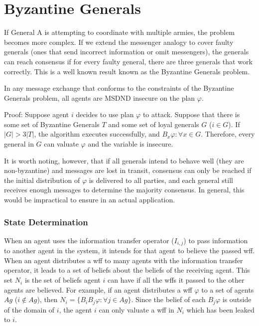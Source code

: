 \section{Byzantine Generals}

If General A is attempting to coordinate with multiple armies, the problem becomes more complex. If we extend the messenger analogy to cover faulty generals (ones that send incorrect information or omit messengers), the generals can reach consensus if for every faulty general, there are three generals that work correctly. This is a well known result known as the Byzantine Generals problem.

\begin{thm}
In any message exchange that conforms to the constraints of the Byzantine Generals problem, all agents are MSDND insecure on the plan $\varphi$.
\end{thm}

Proof: Suppose agent $i$ decides to use plan $\varphi$ to attack. Suppose that there is some set of Byzantine Generals $T$ and some set of loyal generals $G$ ($i \in G$). If $|G| > 3|T|$, the algorithm executes successfully, and $B_x \varphi : \forall x \in G $. Therefore, every general in $G$ can valuate $\varphi$ and the variable is insecure.

It is worth noting, however, that if all generals intend to behave well (they are non-byzantine) and messages are lost in transit, consensus can only be reached if the initial distribution of $\varphi$ is delivered to all parties, and each general still receives enough messages to determine the majority consensus. In general, this would be impractical to ensure in an actual application.

\subsubsection{State Determination}

When an agent uses the information transfer operator ($I_{i,j}$) to pass information to another agent in the system, it intends for that agent to believe the passed wff. When an agent distributes a wff to many agents with the information transfer operator, it leads to a set of beliefs about the beliefs of the receiving agent. This set $N_i$ is the set of beliefs agent $i$ can have if all the wffs it passed to the other agents are believed. For example, if an agent distributes a wff $\varphi$ to a set of agents $Ag$ ($i \not \in Ag$), then $N_i = \{ B_i B_j \varphi : \forall j \in Ag \}$. Since the belief of each $B_j \varphi$ is outside of the domain of $i$, the agent $i$ can only valuate a wff in $N_i$ which has been leaked to $i$.

